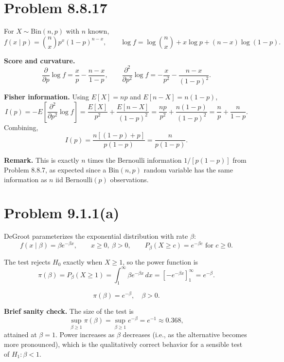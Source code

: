 \documentclass[11pt]{article}
\begin{document}
\section*{Problem 8.8.17}

For $X \sim \mathrm{Bin}(n, p)$ with $n$ known,
\[
f(x \mid p) = \binom{n}{x} p^x(1-p)^{n-x},
\qquad
\log f = \log\binom{n}{x} + x\log p + (n-x)\log(1-p).
\]

\textbf{Score and curvature.}
\[
\frac{\partial}{\partial p}\log f = \frac{x}{p} - \frac{n-x}{1-p},
\qquad
\frac{\partial^2}{\partial p^2}\log f = -\frac{x}{p^2} - \frac{n-x}{(1-p)^2}.
\]

\textbf{Fisher information.} Using $E[X] = np$ and $E[n-X] = n(1-p)$,
\[
I(p) = -E\!\left[\frac{\partial^2}{\partial p^2}\log f\right]
= \frac{E[X]}{p^2} + \frac{E[n-X]}{(1-p)^2}
= \frac{np}{p^2} + \frac{n(1-p)}{(1-p)^2}
= \frac{n}{p} + \frac{n}{1-p}.
\]
Combining,
\[
I(p) = \frac{n[(1-p) + p]}{p(1-p)} = \boxed{\frac{n}{p(1-p)}.}
\]

\textbf{Remark.} This is exactly $n$ times the Bernoulli information $1/[p(1-p)]$ from Problem 8.8.7, as expected since a $\mathrm{Bin}(n,p)$ random variable has the same information as $n$ iid Bernoulli$(p)$ observations.

\section*{Problem 9.1.1(a)}

DeGroot parameterizes the exponential distribution with rate $\beta$:
\[
f(x \mid \beta) = \beta e^{-\beta x}, \qquad x \ge 0,\ \beta > 0,
\qquad
P_\beta(X \ge c) = e^{-\beta c} \text{ for } c \ge 0.
\]

The test rejects $H_0$ exactly when $X \ge 1$, so the power function is
\[
\pi(\beta) = P_\beta(X \ge 1) = \int_1^\infty \beta e^{-\beta x}\,dx
= \left[-e^{-\beta x}\right]_1^\infty = e^{-\beta}.
\]

\[
\boxed{\pi(\beta) = e^{-\beta}, \quad \beta > 0.}
\]

\textbf{Brief sanity check.} The size of the test is
\[
\sup_{\beta \ge 1} \pi(\beta) = \sup_{\beta \ge 1} e^{-\beta} = e^{-1} \approx 0.368,
\]
attained at $\beta = 1$. Power increases as $\beta$ decreases (i.e., as the alternative becomes more pronounced), which is the qualitatively correct behavior for a sensible test of $H_1 : \beta < 1$.
\end{document}
